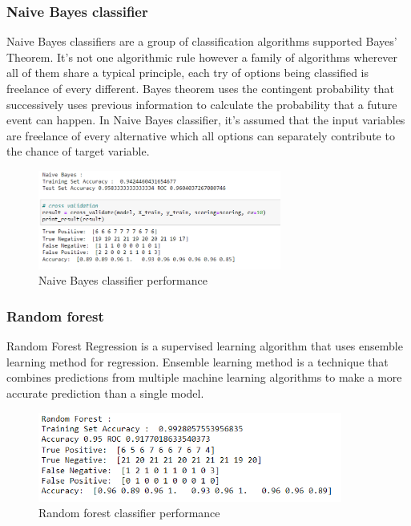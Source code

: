 \documentclass[conference]{IEEEtran}
\begin{document}
\subsubsection{Naive Bayes classifier}
Naive Bayes classifiers are a group of classification algorithms supported Bayes’ Theorem. It’s not one algorithmic rule however a family of algorithms wherever all of them share a typical principle, each try of options being classified is freelance of every different. Bayes theorem uses the contingent probability that successively uses previous information to calculate the probability that a future event can happen. In Naive Bayes classifier, it’s assumed that the input variables are freelance of every alternative which all options can separately contribute to the chance of target variable.
\begin{figure}[htbp]
\centerline{\includegraphics[width=80mm]{naive.png}}
\caption{Naive Bayes classifier performance}
\label{fig}
\end{figure}
 
\subsubsection{Random forest}
Random Forest Regression is a supervised learning algorithm that uses ensemble learning method for regression. Ensemble learning method is a technique that combines predictions from multiple machine learning algorithms to make a more accurate prediction than a single model.
\begin{figure}[htbp]
\centerline{\includegraphics[width=100mm]{random.png}}
\caption{Random forest classifier performance}
\label{fig}
\end{figure}
\end{document}
